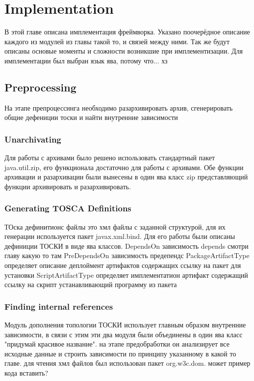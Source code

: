 
\chapter{Implementation}\label{chap:imp}

В этой главе описана имплементация фреймворка. Указано поочерёдное описание каждого из модулей из главы такой то, и связей между ними. Так же будут описаны основые моменты и сложности возникшие при имплементизации.
Для имплементации был выбран язык ява, потому что... хз
\fi
\section{Preprocessing}
На этапе препроцессинга необходимо разархивировать архив, сгенерировать общие дефениции тоски и найти внутренние зависимости
\fi
\subsection*{Unarchivating}
Для работы с архивами было решено использовать стандартный пакет java.util.zip, его функционала достаточно для работы с архивами. Обе функции архивации и разархивации были вынесены в один ява класс zip представляющий функции архивировать и разархивировать. 
\fi
\subsection*{Generating TOSCA Definitions}
ТОска дефинитионс файлы это хмл файлы с заданной структурой, для их генерации  используется пакет javax.xml.bind. Для его работы были описаны дефиниции ТОСКИ в виде ява классов. 
DependsOn зависимость depends смотри главу какую то там
PreDependsOn зависимость предепендс
PackageArtifactType определяет описание деплоймент артифактов содержащих ссылку на пакет для установки 
ScriptArtifactType  определяет имплементатион артифакт содержащий ссылку на скрипт устанавливающий программу из пакета 
\fi
\subsection*{Finding internal references}
Модуль дополнения топологии ТОСКИ использует главным образом внутренние зависимости, в связи с этим эти два модуля были объединены в один ява класс "придумай красивое название". на этапе предобработки он анализирует все исходные данные и строить зависимости по принципу указанному в какой то главе. для чтения хмл файлов был использован пакет org.w3c.dom. может пример кода вставить?

